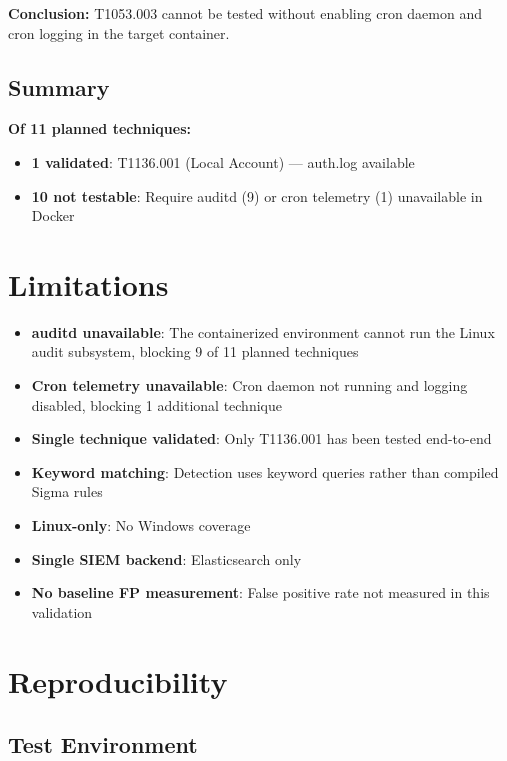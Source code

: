 \documentclass[11pt,a4paper]{article}
\begin{document}
\textbf{Conclusion:} T1053.003 cannot be tested without enabling cron daemon and cron logging in the target container.

\subsection{Summary}

\textbf{Of 11 planned techniques:}
\begin{itemize}
    \item \textbf{1 validated}: T1136.001 (Local Account) --- auth.log available
    \item \textbf{10 not testable}: Require auditd (9) or cron telemetry (1) unavailable in Docker
\end{itemize}

\section{Limitations}

\begin{itemize}
    \item \textbf{auditd unavailable}: The containerized environment cannot run the Linux audit subsystem, blocking 9 of 11 planned techniques
    \item \textbf{Cron telemetry unavailable}: Cron daemon not running and logging disabled, blocking 1 additional technique
    \item \textbf{Single technique validated}: Only T1136.001 has been tested end-to-end
    \item \textbf{Keyword matching}: Detection uses keyword queries rather than compiled Sigma rules
    \item \textbf{Linux-only}: No Windows coverage
    \item \textbf{Single SIEM backend}: Elasticsearch only
    \item \textbf{No baseline FP measurement}: False positive rate not measured in this validation
\end{itemize}

\section{Reproducibility}

\subsection{Test Environment}
\end{document}
